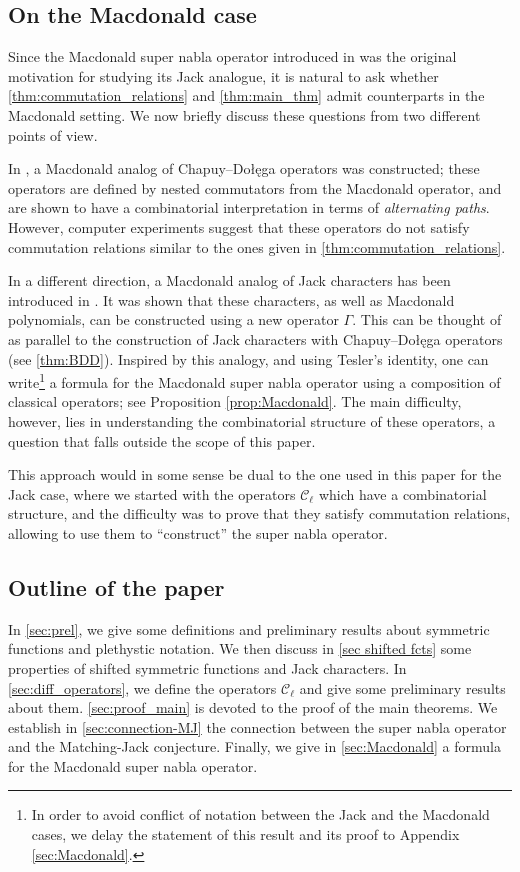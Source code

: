 \documentclass[12pt]{amsart}
\theoremstyle{remark}
\newcommand{\C}{\mathcal C}
\begin{document}
\subsection{On the Macdonald case}
Since the Macdonald super nabla operator introduced in \cite{BergeronHaglundIraciRomero2023} was the original motivation for studying its Jack analogue, it is natural to ask whether \cref{thm:commutation_relations} and \cref{thm:main_thm} admit counterparts in the Macdonald setting. We now briefly discuss these questions from two different points of view.

In \cite{BenDaliBonzomDolega2025}, a Macdonald analog of Chapuy--Do\l{}e\k{}ga operators was constructed; these operators are defined by nested commutators from the Macdonald operator, and are shown to have a combinatorial interpretation in terms of \emph{alternating paths}. However, computer experiments suggest that these operators do not satisfy commutation relations similar to the ones given in \cref{thm:commutation_relations}.

In a different direction, a Macdonald analog of Jack characters has been introduced in \cite{BenDaliDAdderio2023}. It was shown that these characters, as well as Macdonald polynomials, can be constructed using a new operator $\Gamma$. This can be thought of as parallel to the construction of Jack characters with Chapuy--Do\l{}e\k{}ga operators (see \cref{thm:BDD}). Inspired by this analogy, and using Tesler's identity, one can write\footnote{In order to avoid conflict of notation between the Jack and the Macdonald cases, we delay the statement of this result and its proof to Appendix \ref{sec:Macdonald}.} a formula for the Macdonald super nabla operator using a composition of classical operators; see Proposition \ref{prop:Macdonald}.
The main difficulty, however, lies in understanding the combinatorial structure of these operators, a question that falls outside the scope of this paper.

 This approach would in some sense be dual to the one used in this paper for the Jack case, where we started with the operators $\C_\ell$ which have a combinatorial structure, and the difficulty was to prove that they satisfy commutation relations, allowing to use them to ``construct'' the super nabla operator. 


\subsection{Outline of the paper}
In \cref{sec:prel}, we give some definitions and preliminary results about symmetric functions and plethystic notation. We then discuss in \cref{sec shifted fcts} some properties of shifted symmetric functions and Jack characters. In \cref{sec:diff_operators}, we define the operators $\C_\ell$  and give some preliminary results about them.  \cref{sec:proof_main} is devoted to the proof of the main theorems. We establish in \cref{sec:connection-MJ} the connection between the super nabla operator and the Matching-Jack conjecture. Finally, we give in \cref{sec:Macdonald} a formula for the Macdonald super nabla operator.
\end{document}
